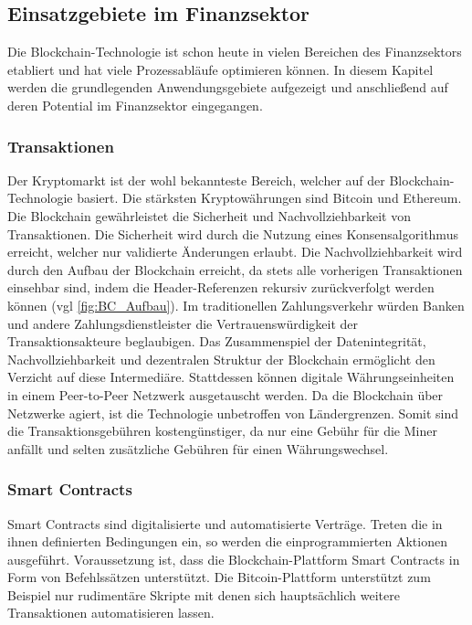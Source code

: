 \newpage
\subsection{Einsatzgebiete im Finanzsektor}
Die Blockchain-Technologie ist schon heute in vielen Bereichen des Finanzsektors etabliert und hat viele 
Prozessabläufe optimieren können. In diesem Kapitel werden die grundlegenden Anwendungsgebiete aufgezeigt
und anschließend auf deren Potential im Finanzsektor eingegangen.



\subsubsection{Transaktionen}
Der Kryptomarkt ist der wohl bekannteste Bereich, welcher auf der Blockchain-Technologie basiert.
Die stärksten Kryptowährungen sind Bitcoin und Ethereum. 
Die Blockchain gewährleistet die Sicherheit und Nachvollziehbarkeit von Transaktionen. 
\cite[p.~168]{chowdhary2025smart}
Die Sicherheit wird durch die Nutzung eines Konsensalgorithmus erreicht, welcher nur validierte 
Änderungen erlaubt. Die Nachvollziehbarkeit wird  durch den Aufbau der Blockchain erreicht, da stets 
alle vorherigen Transaktionen einsehbar sind, indem die Header-Referenzen rekursiv zurückverfolgt
werden können (vgl \autoref{fig:BC_Aufbau}).
Im traditionellen Zahlungsverkehr würden Banken und andere Zahlungsdienstleister die 
Vertrauenswürdigkeit der Transaktionsakteure beglaubigen.
Das Zusammenspiel der Datenintegrität, Nachvollziehbarkeit und dezentralen Struktur der
Blockchain ermöglicht den Verzicht auf diese Intermediäre. Stattdessen können digitale 
Währungseinheiten in einem Peer-to-Peer Netzwerk ausgetauscht werden.
\cite[p.~32]{fill2020blockchain}
Da die Blockchain über Netzwerke agiert, ist die Technologie unbetroffen von Ländergrenzen.
Somit sind die Transaktionsgebühren kostengünstiger, da nur eine Gebühr für 
die Miner anfällt und selten zusätzliche Gebühren für einen Währungswechsel.
\cite[p.~167]{chowdhary2025smart}


\subsubsection{Smart Contracts}
\label{sec:SmartContracts}
Smart Contracts sind digitalisierte und automatisierte Verträge.
\cite[p.~14]{pirafelnerblockchaintechnologie}
Treten die in ihnen definierten Bedingungen ein, so werden die einprogrammierten Aktionen
ausgeführt.
\cite[p.~55f]{fill2020blockchain}
Voraussetzung ist, dass die Blockchain-Plattform Smart Contracts in Form von 
Befehlssätzen unterstützt. Die Bitcoin-Plattform unterstützt zum Beispiel nur rudimentäre
Skripte mit denen sich hauptsächlich weitere Transaktionen automatisieren lassen. 

